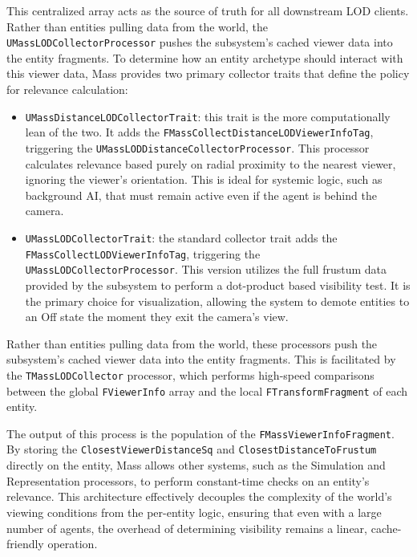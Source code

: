 This centralized array acts as the source of truth for all downstream LOD clients. Rather than entities pulling data from the world, the \newline\texttt{UMassLODCollectorProcessor} pushes the subsystem's cached viewer data into the entity fragments. To determine how an entity archetype should interact with this viewer data, Mass provides two primary collector traits that define the policy for relevance calculation:

\begin{itemize}
    \item \texttt{UMassDistanceLODCollectorTrait}: this trait is the more computationally lean of the two. It adds the \texttt{FMassCollectDistanceLODViewerInfoTag}, triggering the \texttt{UMassLODDistanceCollectorProcessor}. This processor calculates relevance based purely on radial proximity to the nearest viewer, ignoring the viewer's orientation. This is ideal for systemic logic, such as background AI, that must remain active even if the agent is behind the camera.
    \item \texttt{UMassLODCollectorTrait}: the standard collector trait adds the \newline\texttt{FMassCollectLODViewerInfoTag}, triggering the \newline\texttt{UMassLODCollectorProcessor}. This version utilizes the full frustum data provided by the subsystem to perform a dot-product based visibility test. It is the primary choice for visualization, allowing the system to demote entities to an Off state the moment they exit the camera's view.
\end{itemize}


Rather than entities pulling data from the world, these processors push the subsystem's cached viewer data into the entity fragments. This is facilitated by the \texttt{TMassLODCollector} processor, which performs high-speed comparisons between the global \texttt{FViewerInfo} array and the local \texttt{FTransformFragment} of each entity.

The output of this process is the population of the \texttt{FMassViewerInfoFragment}. By storing the \texttt{ClosestViewerDistanceSq} and \texttt{ClosestDistanceToFrustum} directly on the entity, Mass allows other systems, such as the Simulation and Representation processors, to perform constant-time checks on an entity's relevance. This architecture effectively decouples the complexity of the world’s viewing conditions from the per-entity logic, ensuring that even with a large number of agents, the overhead of determining visibility remains a linear, cache-friendly operation.


